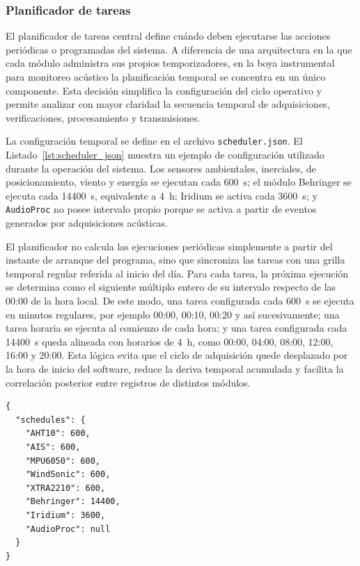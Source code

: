 \subsubsection{Planificador de tareas}
\label{subsubsec:planificador_tareas}

El planificador de tareas central define cuándo deben ejecutarse las acciones periódicas o programadas del sistema. A diferencia de una arquitectura en la que cada módulo administra sus propios temporizadores, en la boya instrumental para monitoreo acústico la planificación temporal se concentra en un único componente. Esta decisión simplifica la configuración del ciclo operativo y permite analizar con mayor claridad la secuencia temporal de adquisiciones, verificaciones, procesamiento y transmisiones.

La configuración temporal se define en el archivo \texttt{scheduler.json}. El Listado~\ref{lst:scheduler_json} muestra un ejemplo de configuración utilizado durante la operación del sistema. Los sensores ambientales, inerciales, de posicionamiento, viento y energía se ejecutan cada 600~s; el módulo Behringer se ejecuta cada 14400~s, equivalente a 4~h; Iridium se activa cada 3600~s; y \texttt{AudioProc} no posee intervalo propio porque se activa a partir de eventos generados por adquisiciones acústicas.

El planificador no calcula las ejecuciones periódicas simplemente a partir del instante de arranque del programa, sino que sincroniza las tareas con una grilla temporal regular referida al inicio del día. Para cada tarea, la próxima ejecución se determina como el siguiente múltiplo entero de su intervalo respecto de las 00:00 de la hora local. De este modo, una tarea configurada cada 600~s se ejecuta en minutos regulares, por ejemplo 00:00, 00:10, 00:20 y así sucesivamente; una tarea horaria se ejecuta al comienzo de cada hora; y una tarea configurada cada 14400~s queda alineada con horarios de 4~h, como 00:00, 04:00, 08:00, 12:00, 16:00 y 20:00. Esta lógica evita que el ciclo de adquisición quede desplazado por la hora de inicio del software, reduce la deriva temporal acumulada y facilita la correlación posterior entre registros de distintos módulos.

\vspace{10px}
\begin{lstlisting}[style=pseudocodigo, caption={Ejemplo de configuración temporal en \texttt{scheduler.json}.}, label={lst:scheduler_json}]
{
  "schedules": {
    "AHT10": 600,
    "AIS": 600,
    "MPU6050": 600,
    "WindSonic": 600,
    "XTRA2210": 600,
    "Behringer": 14400,
    "Iridium": 3600,
    "AudioProc": null
  }
}
\end{lstlisting}

